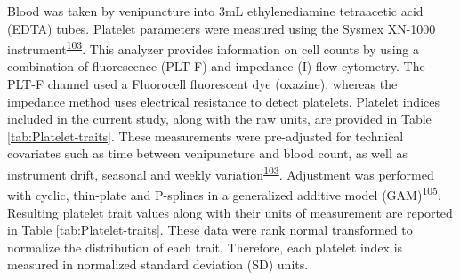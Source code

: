 \documentclass[11pt,twoside]{bristolthesis}
\begin{document}
Blood was taken by venipuncture into 3mL ethylenediamine tetraacetic acid (EDTA) tubes. Platelet parameters were measured using the Sysmex XN-1000 instrument\textsuperscript{\protect\hyperlink{ref-Astle2016}{103}}. This analyzer provides information on cell counts by using a combination of fluorescence (PLT-F) and impedance (I) flow cytometry. The PLT-F channel used a Fluorocell fluorescent dye (oxazine), whereas the impedance method uses electrical resistance to detect platelets. Platelet indices included in the current study, along with the raw units, are provided in Table \ref{tab:Platelet-traits}. These measurements were pre-adjusted for technical covariates such as time between venipuncture and blood count, as well as instrument drift, seasonal and weekly variation\textsuperscript{\protect\hyperlink{ref-Astle2016}{103}}. Adjustment was performed with cyclic, thin-plate and P-splines in a generalized additive model (GAM)\textsuperscript{\protect\hyperlink{ref-Akbari2020}{105}}. Resulting platelet trait values along with their units of measurement are reported in Table \ref{tab:Platelet-traits}. These data were rank normal transformed to normalize the distribution of each trait. Therefore, each platelet index is measured in normalized standard deviation (SD) units.
\end{document}

